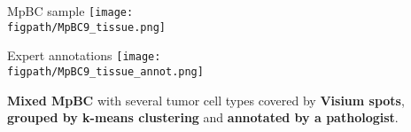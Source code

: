 \documentclass[aspectratio=169]{beamer}
\newcommand{\figpath}{/mnt/datadisk/Jordan/Delivrables/Rapports/Rapport_stage/Figures/Sans_légendes}
\begin{document}
\begin{frame}{MpBC sample}
    \centering
    \texttt{[image: \\figpath/MpBC9\_tissue.png]}
    \vspace{0.82cm}
\end{frame}

\begin{frame}{Expert annotations}
    \centering
    \texttt{[image: \\figpath/MpBC9\_tissue\_annot.png]}

    \vspace{0.3cm} %
    \textbf{Mixed MpBC} with several tumor cell types covered by \textbf{Visium spots},\\
    \textbf{grouped by k-means clustering} and \textbf{annotated by a pathologist}.
\end{frame}
\end{document}
